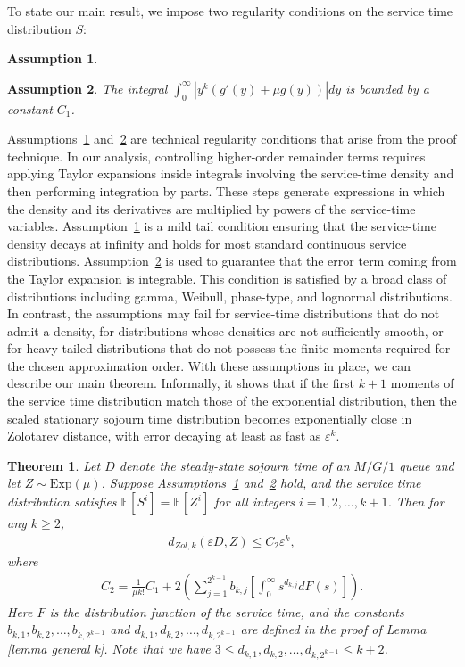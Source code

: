 \documentclass[11pt,letterpaper,reqno]{article}
\theoremstyle{thmstyleone}%
\newtheorem{theorem}{Theorem}%
\theoremstyle{thmstyletwo}%
\theoremstyle{thmstylethree}%
\newtheorem{assumption}{Assumption}
\numberwithin{equation}{section}
\begin{document}
To state our main result, we impose two regularity conditions on the service time distribution $S$:
\begin{assumption}\label{assump1}
\end{assumption}
\begin{assumption}\label{assump2}
    The integral $\int_0^\infty |y^k(g'(y)+\mu g(y))|dy$ is bounded by a constant $C_1$. 
\end{assumption}
\noindent
Assumptions~\ref{assump1} and~\ref{assump2} are technical regularity conditions that arise from the proof technique. In our analysis, controlling higher-order remainder terms requires applying Taylor expansions inside integrals involving the service-time density and then performing integration by parts. These steps  generate expressions in which the density and its derivatives are multiplied by powers of the service-time variables. Assumption~\ref{assump1} is a mild tail condition ensuring that the service-time density decays at infinity and holds for most standard continuous service distributions. Assumption~\ref{assump2} is used to guarantee that the error term coming from the Taylor expansion is integrable. This condition is satisfied by a broad class of distributions including gamma, Weibull, phase-type, and lognormal distributions. In contrast, the assumptions may fail for  service-time distributions that do not admit a density, for distributions whose densities are not sufficiently smooth, or for heavy-tailed distributions that do not possess the finite moments required for the chosen approximation order.
With these assumptions in place, we can describe our main theorem. Informally, it shows that if the first $k+1$ moments of the service time distribution match those of the exponential distribution, then the scaled stationary sojourn time distribution becomes exponentially close in Zolotarev distance, with error decaying at least as fast as $\varepsilon^k$.
\begin{theorem}\label{thm1}
Let $D$ denote the steady-state sojourn time of an $M/G/1$ queue and let $Z \sim \mathrm{Exp}(\mu)$. Suppose Assumptions~\ref{assump1} and~\ref{assump2} hold, and the service time distribution satisfies $\mathbb{E}[S^i] = \mathbb{E}[Z^i]$ for all integers $i=1,2,\ldots,k+1$. Then for any $k\geq 2$,
\begin{align*}   
    d_{Zol,k}(\varepsilon D,Z)\leq C_2\varepsilon^k,
\end{align*}
where
\begin{align*}
    C_2=\frac{1}{\mu k!}C_1 +2  \left( \sum_{j=1}^{2^{k-1}}b_{k,j}   \left[ \int_0^\infty s^{d_{k,j}} dF(s)\right]\right).
\end{align*}
Here $F$ is the distribution function of the service time, and the constants $b_{k,1},b_{k,2}, \ldots, b_{k,2^{k-1}}$ and $d_{k,1},d_{k,2}, \ldots, d_{k,2^{k-1}}$ are defined in the proof of Lemma \ref{lemma general k}. Note that we have $3 \leq d_{k,1},d_{k,2}, \ldots, d_{k,2^{k-1}} \leq k+2$.
\end{theorem}
\end{document}
